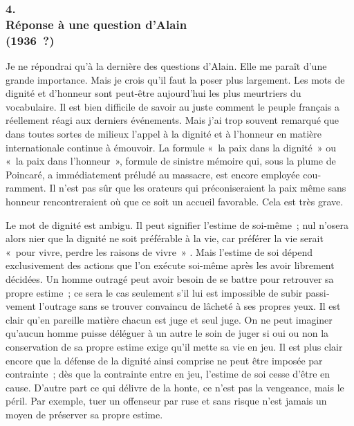 \documentclass[french,twoside]{book} %
\begin{document}
\subsubsection[{4. Réponse à une question d’Alain  (1936 ?)}]{4. \\
Réponse à une question d’Alain \protect\footnotemark  \\
(1936 ?)}
\noindent \par
Je ne répondrai qu'à la dernière des questions d'Alain. Elle me paraît d'une grande importance. Mais je crois qu'il faut la poser plus largement. Les mots de dignité et d'honneur sont peut-être aujourd'hui les plus meurtriers du vocabulaire. Il est bien difficile de savoir au juste comment le peuple français a réellement réagi aux derniers événements. Mais j'ai trop souvent remarqué que dans toutes sortes de milieux l'appel à la dignité et à l'honneur en matière internationale continue à émouvoir. La formule « la paix dans la dignité » ou « la paix dans l'honneur », formule de sinistre mémoire qui, sous la plume de Poincaré, a immédiatement préludé au massacre, est encore employée cou­ramment. Il n'est pas sûr que les orateurs qui préconiseraient la paix même sans honneur rencontreraient où que ce soit un accueil favorable. Cela est très grave.\par
Le mot de dignité est ambigu. Il peut signifier l'estime de soi-même ; nul n'osera alors nier que la dignité ne soit préférable à la vie, car préférer la vie serait « pour vivre, perdre les raisons de vivre » . Mais l'estime de soi dépend exclusivement des actions que l'on exécute soi-même après les avoir librement décidées. Un homme outragé peut avoir besoin de se battre pour retrouver sa propre estime ; ce sera le cas seulement s'il lui est impossible de subir passi­vement l'outrage sans se trouver convaincu de lâcheté à ses propres yeux. Il est clair qu'en pareille matière chacun est juge et seul juge. On ne peut imaginer qu'aucun homme puisse déléguer à un autre le soin de juger si oui ou non la conservation de sa propre estime exige qu'il mette sa vie en jeu. Il est plus clair encore que la défense de la dignité ainsi comprise ne peut être imposée par contrainte ; dès que la contrainte entre en jeu, l'estime de soi cesse d'être en cause. D'autre part ce qui délivre de la honte, ce n'est pas la vengeance, mais le péril. Par exemple, tuer un offenseur par ruse et sans risque n'est jamais un moyen de préserver sa propre estime.\par
\end{document}

